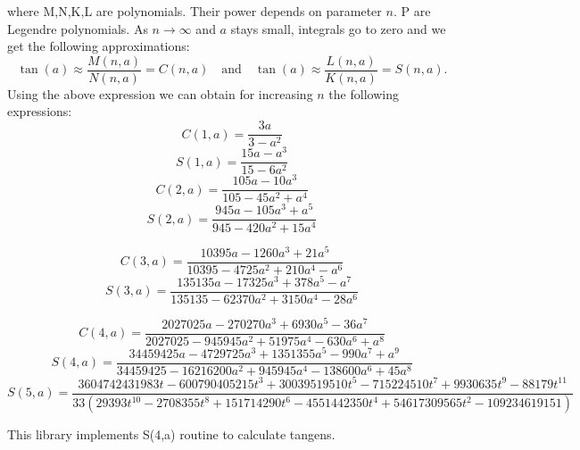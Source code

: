 \documentclass[openany, longbibliography,slovene,a4paper,12pt]{article}
\begin{document}
where M,N,K,L are polynomials. Their power depends on parameter $n$. P are
Legendre polynomials. As $n\rightarrow\infty$ and $a$ stays small, integrals go
to zero and we get the following approximations:
\begin{equation}
  \tan(a)\approx \frac{M(n,a)}{N(n,a)}=C(n,a) \quad \mathrm{and} \quad  \tan(a)\approx \frac{L(n,a)}{K(n,a)}=S(n,a).
\end{equation}
Using the above expression we can obtain for increasing $n$ the following
expressions:
\begin{equation}
  C(1,a)=\frac{3a}{3-a^2}
\end{equation}
\begin{equation}
  S(1,a)=\frac{15a-a^3}{15-6a^2}
\end{equation}
\begin{equation}
  C(2,a)=\frac{105a-10a^3}{105-45a^2+a^4}
\end{equation}
\begin{equation}
  S(2,a)=\frac{945a-105a^3+a^5}{945-420a^2+15a^4}
\end{equation}

\begin{equation}
  C(3,a)=\frac{10395 a- 1260 a^3 +21 a^5}{10395 - 4725 a^2+ 210a^4- a^6}
\end{equation}
\begin{equation}
  S(3,a)=\frac{135135 a - 17325 a^3+378 a^5 - a^7}{135135 - 62370 a^2+ 3150 a^4- 28 a^6}
\end{equation}

\begin{equation}
  C(4,a)=\frac{2027025 a -270270 a^3 +6930 a^5- 36 a^7}{2027025 -945945 a^2 +51975 a^4 -630 a^6 +a^8}
\end{equation}
\begin{equation}
  S(4,a)=\frac{34459425 a -4729725 a^3 +1351355 a^5 -990 a^7+ a^9}{34459425 -16216200 a^2 + 945945 a^4 -138600 a^6+ 45 a^8}
\end{equation}
\scriptsize
\begin{equation}
  S(5,a)=\frac{3604742431983 t - 600790405215 t^3 + 30039519510 t^5 - 
 715224510 t^7 + 9930635 t^9 - 88179 t^{11}}{33 \left(29393 t^{10}-2708355 t^8+151714290 t^6-4551442350 t^4+54617309565 t^2-109234619151\right)}
\end{equation}
\normalsize

This library implements S(4,a) routine to calculate tangens.
\end{document}
